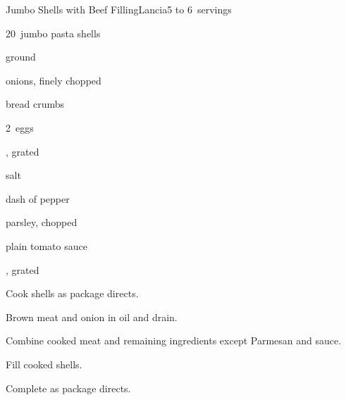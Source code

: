 \begin{recipe}{Jumbo Shells with Beef Filling\FIXME}{Lancia}{5 to 6~servings}

\begin{ingredients}
\item 20~jumbo pasta shells
\item {} ground 
\item \C{\quarter} onions, finely chopped
\item \C{\quarter} bread crumbs
\item 2~eggs
\item {} , grated
\item \tp{\half} salt
\item dash of pepper
\item {} parsley, chopped
\item \C{3\half} plain tomato sauce
\item \C{\quarter} , grated
\end{ingredients}

\begin{directions}
\item Cook shells as package directs.
\item Brown meat and onion in oil and drain.
\item Combine cooked meat and remaining ingredients except Parmesan and sauce.
\item Fill cooked shells.
\item Complete as package directs.
\end{directions}

\end{recipe}
